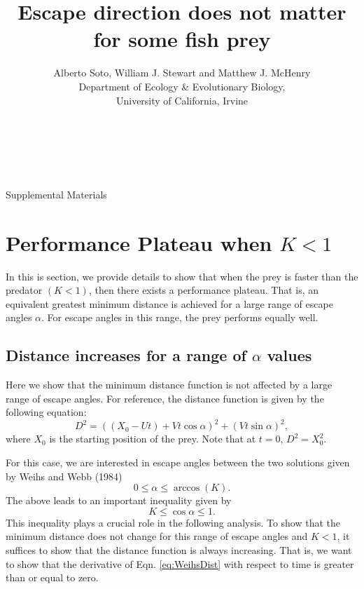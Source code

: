\documentclass[12pt]{article}
\title{Escape direction does not matter for some fish prey}
\author{Alberto Soto, William J. Stewart and Matthew J. McHenry\\
  Department of Ecology \& Evolutionary Biology,\\
  University of California, Irvine\\ \\ \\ \\}
\begin{document}

\maketitle
{\Large Supplemental Materials}

\tableofcontents

\newpage
\section{Performance Plateau when $K < 1$}
In this is section, we provide details to show that when the prey is faster than the predator $(K<1)$, then there exists a performance plateau. That is, an equivalent greatest minimum distance is  achieved for a large range of escape angles $\alpha$. For escape angles in this range, the prey performs equally well.   

\subsection{Distance increases for a range of $\alpha$ values}
Here we show that the minimum distance function is not affected by a large range of escape angles. For reference, the distance function is given by the following equation:
%
\begin{equation}
D^2 = ((X_0 - Ut) + Vt\cos\alpha)^2 + (Vt\sin\alpha)^2,
\label{eq:WeihsDist}
\end{equation}
%
where $X_0$ is the starting position of the prey. Note that at $t=0$, $D^2 = X_0^2.$ 

For this case, we are interested in escape angles between the two solutions given by Weihs and Webb (1984)
%
\begin{equation}
0 \leq \alpha \leq \arccos(K).
\label{alpharange}
\end{equation}
The above leads to an important inequality given by
\begin{equation}
K \leq \cos\alpha \leq 1.
\label{cosinebound}
\end{equation} 
This inequality plays a crucial role in the following analysis.      
%
To show that the minimum distance does not change for this range of escape angles and $K<1$, it suffices to show that the distance function is always increasing. That is, we want to show that the derivative of Eqn. \ref{eq:WeihsDist} with respect to time is greater than or equal to zero. 
\end{document}

